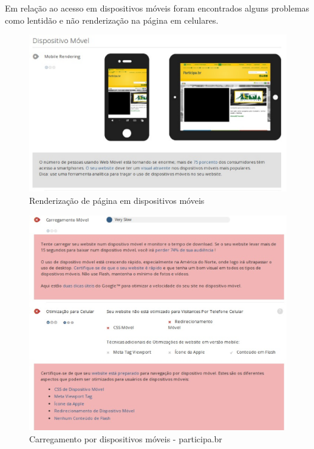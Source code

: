 Em relação ao acesso em dispositivos móveis foram encontrados alguns problemas como lentidão e não renderização na página em celulares.

\begin{figure}[!h]
    \centering
    \includegraphics[keepaspectratio=true,scale=0.60]
      {figuras/movel.eps}
    \caption{Renderização de página em dispositivos móveis}
    \label{movel}
\end{figure}

\begin{figure}[!h]
    \centering
    \includegraphics[keepaspectratio=true,scale=0.60]
      {figuras/carregamentomovel.eps}
    \caption{Carregamento por dispositivos móveis - participa.br}
    \label{carregamentomovel}
\end{figure}

